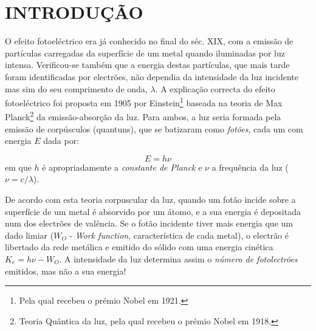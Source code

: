 \documentclass[a4paper,12pt]{article}  %
\begin{document}
\section{\sf INTRODUÇÃO }
O efeito fotoeléctrico era já conhecido no final do séc. XIX, com a emissão  de partículas carregadas da superfície de um metal quando iluminadas por luz intensa. Verificou-se também que a energia destas partículas, que mais tarde foram identificadas por electrões, não dependia da intensidade da luz incidente mas sim do  seu comprimento de onda, $\lambda$.  A explicação correcta do efeito fotoeléctrico foi proposta em 1905 por Einstein\footnote{Pela qual recebeu o prémio Nobel em 1921.} baseada na teoria de Max Planck\footnote{Teoria Quântica da luz, pela qual recebeu o prémio Nobel em 1918.} da emissão-absorção da luz. Para ambos, a luz seria formada pela emissão de  corpúsculos (quantuns), que se batizaram como \emph{fotões}, cada um com energia $E$  dada por:

\begin{equation}
	\label{eq:energia2}
	E = h \nu %
\end{equation}
em que $h$ é apropriadamente a \emph{constante de Planck} e $\nu$ a frequência da luz ($\nu=c/\lambda$).  

De acordo com esta teoria corpuscular da luz, quando um fotão incide sobre a superfície de um metal é absorvido por um átomo, e a sua energia é depositada num dos electrões de valência.
 Se o fotão incidente tiver mais energia que um dado limiar ($W_O$ - \emph{Work function}, característica de cada metal), o  electrão é libertado da rede metálica e emitido do sólido com uma energia cinética $K_e = h\nu - W_O$.
A intensidade da luz determina assim o \emph{número de fotolectrões} emitidos, mas não a sua energia!
\end{document}
